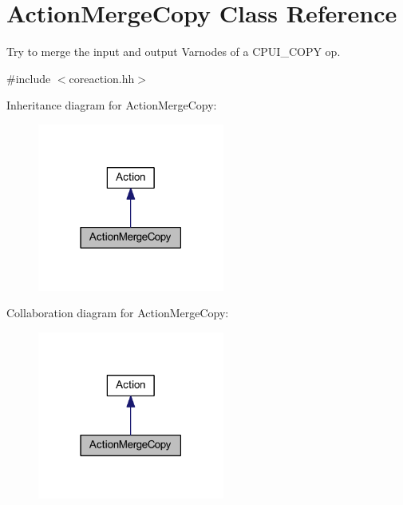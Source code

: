 \hypertarget{class_action_merge_copy}{}\section{Action\+Merge\+Copy Class Reference}
\label{class_action_merge_copy}


Try to merge the input and output Varnodes of a C\+P\+U\+I\+\_\+\+C\+O\+PY op.  




{\ttfamily \#include $<$coreaction.\+hh$>$}



Inheritance diagram for Action\+Merge\+Copy\+:
\nopagebreak
\begin{figure}[H]
\begin{center}
\leavevmode
\includegraphics[width=174pt]{class_action_merge_copy__inherit__graph}
\end{center}
\end{figure}


Collaboration diagram for Action\+Merge\+Copy\+:
\nopagebreak
\begin{figure}[H]
\begin{center}
\leavevmode
\includegraphics[width=174pt]{class_action_merge_copy__coll__graph}
\end{center}
\end{figure}
